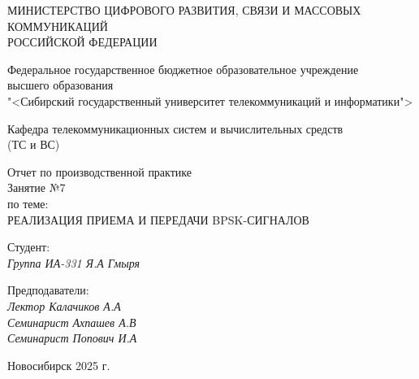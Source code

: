 \thispagestyle{empty}

\begin{center}
    МИНИСТЕРСТВО ЦИФРОВОГО РАЗВИТИЯ, СВЯЗИ И МАССОВЫХ КОММУНИКАЦИЙ \\ РОССИЙСКОЙ ФЕДЕРАЦИИ

    \vspace{20pt}

    Федеральное государственное бюджетное образовательное учреждение  \\  высшего образования \\
    "<Сибирский государственный университет телекоммуникаций и информатики"> \\

    \vspace{20pt}

    Кафедра телекоммуникационных систем и вычислительных средств \\  (ТС и ВС)
\end{center}

\vfill

\begin{center}
    Отчет по производственной практике \\  
    Занятие №7 \\

    \vspace{20pt}
    по теме: \\
    \uppercase{Реализация приема и передачи BPSK-сигналов}
\end{center}

\vfill

    \noindent Студент: \\
    \textit{Группа ИА-331 \hfill Я.А Гмыря}

    \vspace{20pt}

    \noindent Предподаватели: \\
    \textit{Лектор \hfill Калачиков А.А} \\
    \textit{Семинарист \hfill Ахпашев А.В} \\
    \textit{Семинарист \hfill Попович И.А}

\vfill

\begin{center}
    Новосибирск 2025 г.
\end{center}